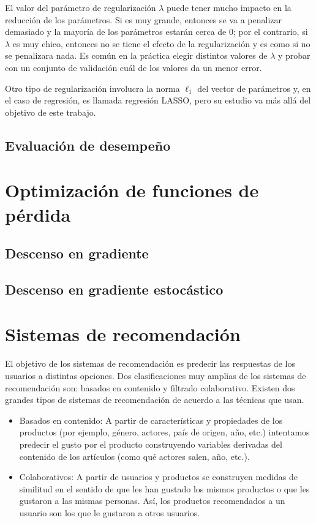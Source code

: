 El valor del parámetro de regularización $\lambda$ puede tener mucho impacto en la reducción de los parámetros. Si es muy grande, entonces se va a penalizar demasiado y la mayoría de los parámetros estarán cerca de 0; por el contrario, si $\lambda$ es muy chico, entonces no se tiene el efecto de la regularización y es como si no se penalizara nada. Es común en la práctica elegir distintos valores de $\lambda$ y probar con un conjunto de validación cuál de los valores da un menor error.

Otro tipo de regularización involucra la norma $\ell_1$ del vector de parámetros y, en el caso de regresión, es llamada regresión LASSO, pero su estudio va más allá del objetivo de este trabajo.

\subsection{Evaluación de desempeño}

\section{Optimización de funciones de pérdida}

\subsection{Descenso en gradiente}

\subsection{Descenso en gradiente estocástico}

\section{Sistemas de recomendación}

El objetivo de los sistemas de recomendación es predecir las respuestas de los usuarios a distintas opciones. Dos clasificaciones muy amplias de los sistemas de recomendación son: basados en contenido y filtrado colaborativo. Existen dos grandes tipos de sistemas de recomendación de acuerdo a las técnicas que usan.

\begin{itemize}
\item Basados en contenido: A partir de características y propiedades de los productos (por ejemplo, género, actores, país de origen, año, etc.) intentamos predecir el gusto por el producto construyendo variables derivadas del contenido de los artículos (como qué actores salen, año, etc.).
\item Colaborativos: A partir de usuarios y productos se construyen medidas de similitud en el sentido de que les han gustado los mismos productos o que les gustaron a las mismas personas. Así, los productos recomendados a un usuario son los que le gustaron a otros usuarios.
\end{itemize}

